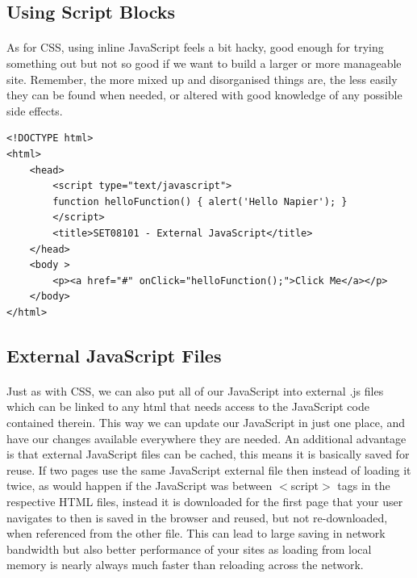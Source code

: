 \documentclass[10pt, a4paper, twosize]{article}
\begin{document}
\subsection{Using Script Blocks}
\paragraph{} As for CSS, using inline JavaScript feels a bit hacky, good enough for trying something out but not so good if we want to build a larger or more manageable site. Remember, the more mixed up and disorganised things are, the less easily they can be found when needed, or altered with good knowledge of any possible side effects.


\begin{lstlisting}
<!DOCTYPE html>
<html>
    <head>
        <script type="text/javascript">
        function helloFunction() { alert('Hello Napier'); }
        </script>
        <title>SET08101 - External JavaScript</title>
    </head>
    <body >
        <p><a href="#" onClick="helloFunction();">Click Me</a></p>
    </body>
</html>
\end{lstlisting}

\subsection{External JavaScript Files}

\paragraph{} Just as with CSS, we can also put all of our JavaScript into external .js files which can be linked to any html that needs access to the JavaScript code contained therein. This way we can update our JavaScript in just one place, and have our changes available everywhere they are needed. An additional advantage is that external JavaScript files can be cached, this means it is basically saved for reuse. If two pages use the same JavaScript external file then instead of loading it twice, as would happen if the JavaScript was between $<$script$>$ tags in the respective HTML files, instead it is downloaded for the first page that your user navigates to then is saved in the browser and reused, but not re-downloaded, when referenced from the other file. This can lead to large saving in network bandwidth but also better performance of your sites as loading from local memory is nearly always much faster than reloading across the network. 
\end{document}
